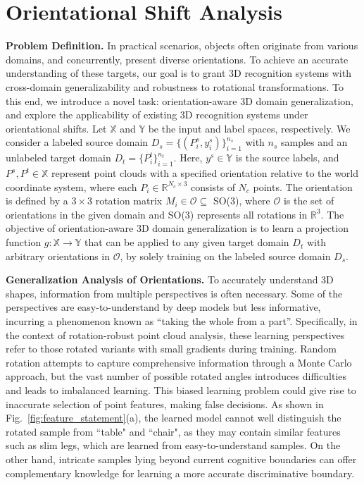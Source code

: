 
\section{Orientational Shift Analysis} \label{sec:analysis}


\textbf{Problem Definition.}
In practical scenarios, objects often originate from various domains, and concurrently, present diverse orientations. To achieve an accurate understanding of these targets, our goal is to grant 3D recognition systems with cross-domain generalizability and robustness to rotational transformations. To this end, we introduce a novel task: orientation-aware 3D domain generalization, and explore the applicability of existing 3D recognition systems under orientational shifts.
Let $\mathbb{X}$ and $\mathbb{Y}$ be the input and label spaces, respectively. We consider a labeled source domain $D_s = {\{(P_i^s, y_i^s)}\}^{n_s}_{i=1}$ with $n_s$ samples and an unlabeled target domain $D_t = \{{P_i^t}\}^{n_t}_{i=1}$. Here, $y^s\in \mathbb{Y}$ is the source labels, and $P^s, P^t \in \mathbb{X}$ represent point clouds with a specified orientation relative to the world coordinate system, where each $P_i \in \mathbb{R}^{N_c \times 3}$ consists of $N_c$ points. The orientation is defined by a $3\times3$ rotation matrix $M_i \in \mathcal{O} \subseteq$ SO(3), where $\mathcal{O}$ is the set of orientations in the given domain and SO(3) represents all rotations in $\mathbb{R}^3$. The objective of orientation-aware 3D domain generalization is to learn a projection function $g: \mathbb{X} \to \mathbb{Y}$ that can be applied to any given target domain $D_t$ with arbitrary orientations in $\mathcal{O}$, by solely training on the labeled source domain $D_s$.




\noindent\textbf{Generalization Analysis of Orientations.}
To accurately understand 3D shapes, information from multiple perspectives is often necessary. Some of the perspectives are easy-to-understand by deep models but less informative, incurring a phenomenon known as ``taking the whole from a part''. Specifically, in the context of rotation-robust point cloud analysis, these learning perspectives refer to those rotated variants with small gradients during training. Random rotation attempts to capture comprehensive information through a Monte Carlo approach, but the vast number of possible rotated angles introduces difficulties and leads to imbalanced learning.
This biased learning problem could give rise to inaccurate selection of point features, making false decisions. As shown in Fig.~\ref{fig:feature_statement}(a), the learned model cannot well distinguish the rotated sample from ``table" and ``chair", as they may contain similar features such as slim legs, which are learned from easy-to-understand samples. 
On the other hand, intricate samples lying beyond current cognitive boundaries can offer complementary knowledge for learning a more accurate discriminative boundary.

